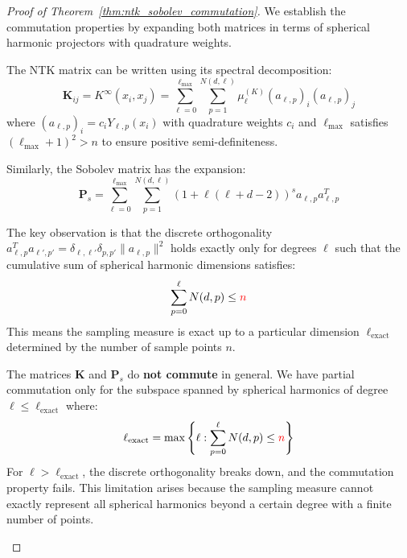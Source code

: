 \documentclass[a4paper]{article}
\theoremstyle{plain}
\theoremstyle{definition}
\theoremstyle{remark}
\begin{document}
\begin{proof}[Proof of Theorem~\ref{thm:ntk_sobolev_commutation}]
We establish the commutation properties by expanding both matrices in terms of spherical harmonic projectors with quadrature weights.

\begin{tcolorbox}[colback=blue!5,colframe=blue!60!black,title=\textbf{NTK Spectral Decomposition}]
The NTK matrix can be written using its spectral decomposition:
\[ \mathbf{K}_{ij} = K^{\infty}(x_i, x_j) = \sum_{\ell=0}^{\ell_{\max}} \sum_{p=1}^{N(d,\ell)} \mu_\ell^{(K)} (a_{\ell,p})_i (a_{\ell,p})_j \]
where $(a_{\ell,p})_i = c_i Y_{\ell,p}(x_i)$ with quadrature weights $c_i$ and $\ell_{\max}$ satisfies $(\ell_{\max}+1)^2 > n$ to ensure positive semi-definiteness.
\end{tcolorbox}

\begin{tcolorbox}[colback=red!5,colframe=red!60!black,title=\textbf{Sobolev Spectral Decomposition}]
Similarly, the Sobolev matrix has the expansion:
\[ \mathbf{P}_s = \sum_{\ell=0}^{\ell_{\max}} \sum_{p=1}^{N(d,\ell)} (1 + \ell(\ell + d - 2))^s a_{\ell,p} a_{\ell,p}^T \]
\end{tcolorbox}

\begin{tcolorbox}[colback=green!5,colframe=green!60!black,title=\textbf{Limited Orthogonality and Partial Commutation}]
The key observation is that the discrete orthogonality $a_{\ell,p}^T a_{\ell',p'} = \delta_{\ell,\ell'} \delta_{p,p'} \|a_{\ell,p}\|^2$ holds exactly only for degrees $\ell$ such that the cumulative sum of spherical harmonic dimensions satisfies:
\[ \sum_{p=0}^{\ell} N(d,p) \leq \textcolor{red}{n} \]
This means the sampling measure is exact up to a particular dimension $\ell_{\text{exact}}$ determined by the number of sample points $n$.
\end{tcolorbox}

\begin{tcolorbox}[colback=orange!10,colframe=orange!60!black,title=\textbf{Remark: Non-Commutation in General}]
The matrices $\mathbf{K}$ and $\mathbf{P}_s$ do \textbf{not commute} in general. We have partial commutation only for the subspace spanned by spherical harmonics of degree $\ell \leq \ell_{\text{exact}}$ where:
\[ \ell_{\text{exact}} = \max\left\{\ell : \sum_{p=0}^{\ell} N(d,p) \leq \textcolor{red}{n}\right\} \]
For $\ell > \ell_{\text{exact}}$, the discrete orthogonality breaks down, and the commutation property fails. This limitation arises because the sampling measure cannot exactly represent all spherical harmonics beyond a certain degree with a finite number of points.
\end{tcolorbox}


\end{proof}
\end{document}
